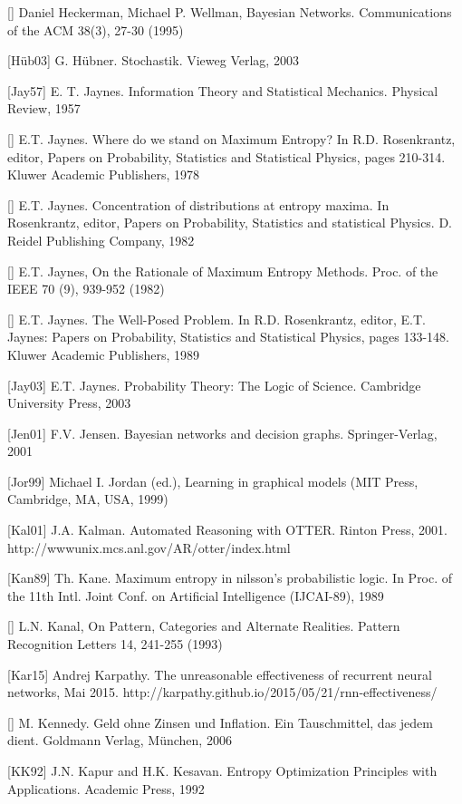 \documentclass[10pt]{book}
\begin{document}
\begin{center}
[\cite{hw95}] Daniel Heckerman, Michael P. Wellman, Bayesian Networks. Communications of the ACM 38(3), 27-30 (1995)

[Hüb03] G. Hübner. Stochastik. Vieweg Verlag, 2003

[Jay57] E. T. Jaynes. Information Theory and Statistical Mechanics. Physical Review, 1957

[\cite{jay78}] E.T. Jaynes. Where do we stand on Maximum Entropy? In R.D. Rosenkrantz, editor, Papers on Probability, Statistics and Statistical Physics, pages 210-314. Kluwer Academic Publishers, 1978

[\cite{jay82a}] E.T. Jaynes. Concentration of distributions at entropy maxima. In Rosenkrantz, editor, Papers on Probability, Statistics and statistical Physics. D. Reidel Publishing Company, 1982

[\cite{jay82b}] E.T. Jaynes, On the Rationale of Maximum Entropy Methods. Proc. of the IEEE 70 (9), 939-952 (1982)

[\cite{jay89}] E.T. Jaynes. The Well-Posed Problem. In R.D. Rosenkrantz, editor, E.T. Jaynes: Papers on Probability, Statistics and Statistical Physics, pages 133-148. Kluwer Academic Publishers, 1989

[Jay03] E.T. Jaynes. Probability Theory: The Logic of Science. Cambridge University Press, 2003

[Jen01] F.V. Jensen. Bayesian networks and decision graphs. Springer-Verlag, 2001

[Jor99] Michael I. Jordan (ed.), Learning in graphical models (MIT Press, Cambridge, MA, USA, 1999)

[Kal01] J.A. Kalman. Automated Reasoning with OTTER. Rinton Press, 2001. http://wwwunix.mcs.anl.gov/AR/otter/index.html

[Kan89] Th. Kane. Maximum entropy in nilsson's probabilistic logic. In Proc. of the 11th Intl. Joint Conf. on Artificial Intelligence (IJCAI-89), 1989

[\cite{kan93}] L.N. Kanal, On Pattern, Categories and Alternate Realities. Pattern Recognition Letters 14, 241-255 (1993)

[Kar15] Andrej Karpathy. The unreasonable effectiveness of recurrent neural networks, Mai 2015. http://karpathy.github.io/2015/05/21/rnn-effectiveness/

[\cite{ken06}] M. Kennedy. Geld ohne Zinsen und Inflation. Ein Tauschmittel, das jedem dient. Goldmann Verlag, München, 2006

[KK92] J.N. Kapur and H.K. Kesavan. Entropy Optimization Principles with Applications. Academic Press, 1992


\end{center}
\end{document}
